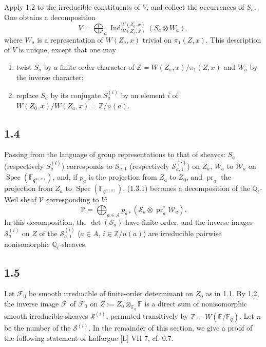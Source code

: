\documentclass[11pt]{article}
\newcommand{\F}{\mathbb{F}}
\newcommand{\Z}{\mathbb{Z}}
\newcommand{\Ql}{\overline{\mathbb Q}_{\ell}}
\newcommand{\Spec}{\operatorname{Spec}}
\newcommand{\Ind}{\operatorname{Ind}}
\newcommand{\pr}{\operatorname{pr}}
\begin{document}
Apply 1.2 to the irreducible constituents of $V$, and collect the occurrences of $S_a$.
One obtains a decomposition
\begin{equation}
 V=\bigoplus_a \Ind_{W(Z_a,x)}^{W(Z_0,x)}(S_a\otimes W_a),
\tag{1.3.1}
\end{equation}
where $W_a$ is a representation of $W(Z_a,x)$ trivial on $\pi_1(Z,x)$.
This description of $V$ is unique, except that one may
\begin{enumerate}[label=\alph*)]
\item twist $S_a$ by a finite-order character of $\Z=W(Z_a,x)/\pi_1(Z,x)$ and $W_a$ by the inverse character;
\item replace $S_a$ by its conjugate $S_a^{(i)}$ by an element $i$ of $W(Z_0,x)/W(Z_a,x)=\Z/n(a)$.
\end{enumerate}

\subsection*{1.4}
Passing from the language of group representations to that of sheaves: $S_a$ (respectively $S_a^{(i)}$) corresponds to $\mathcal S_{a,1}$ (respectively $\mathcal S_{a,1}^{(i)}$) on $Z_a$, $W_a$ to $\mathcal W_a$ on $\Spec(\F_{q^{n(a)}})$, and, if $p_a$ is the projection from $Z_a$ to $Z_0$, and $\pr_a$ the projection from $Z_a$ to $\Spec(\F_{q^{n(a)}})$, (1.3.1) becomes a decomposition of the $\Ql$-Weil sheaf $\mathcal V$ corresponding to $V$:
\begin{equation}
 \mathcal V=\bigoplus_{a\in A}p_{a*}\left(\mathcal S_a\otimes\pr_a^*\mathcal W_a\right).
\tag{1.4.1}
\end{equation}
In this decomposition, the $\det(\mathcal S_a)$ have finite order, and the inverse images $\mathcal S_a^{(i)}$ on $Z$ of the $\mathcal S_{a,1}^{(i)}$ ($a\in A$, $i\in\Z/n(a)$) are irreducible pairwise nonisomorphic $\Ql$-sheaves.

\subsection*{1.5}
Let $\mathcal F_0$ be smooth irreducible of finite-order determinant on $Z_0$ as in 1.1.
By 1.2, the inverse image $\mathcal F$ of $\mathcal F_0$ on $Z:=Z_0\otimes_{\F_q}\F$ is a direct sum of nonisomorphic smooth irreducible sheaves $\mathcal S^{(i)}$, permuted transitively by $\Z=W(\F/\F_q)$.
Let $n$ be the number of the $\mathcal S^{(i)}$.
In the remainder of this section, we give a proof of the following statement of Lafforgue [L] VII 7, cf. 0.7.
\end{document}
